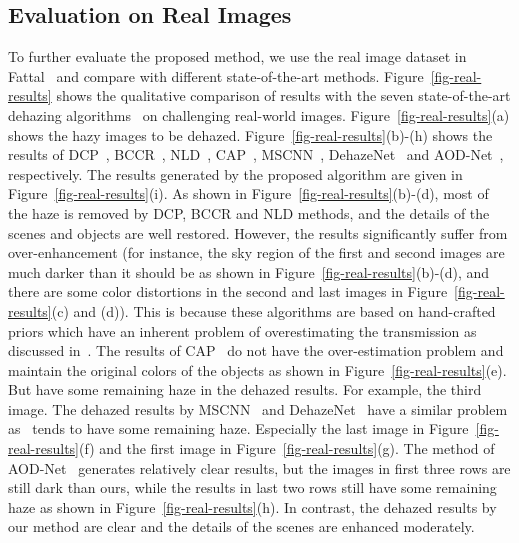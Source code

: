 \documentclass[10pt,twocolumn,letterpaper]{article}
\begin{document}
\subsection{Evaluation on Real Images}
To further evaluate the proposed method, we use the real image dataset in Fattal~\cite{fattal2014dehazing} and compare
with different state-of-the-art methods.
Figure~\ref{fig-real-results} shows the qualitative comparison of results
with the seven state-of-the-art dehazing algorithms~\cite{he2011singlecvpr,meng2013efficient,berman2016non,ren2016single,cai2016dehazenet,li2017aod} on challenging real-world images.
Figure~\ref{fig-real-results}(a) shows the hazy images to be dehazed.
Figure~\ref{fig-real-results}(b)-(h) shows the results of DCP~\cite{he2011singlecvpr}, BCCR~\cite{meng2013efficient}, NLD~\cite{berman2016non}, CAP~\cite{zhu2015fast}, MSCNN~\cite{ren2016single}, DehazeNet~\cite{cai2016dehazenet} and AOD-Net~\cite{li2017aod}, respectively.
The results generated by the proposed algorithm are given in Figure~\ref{fig-real-results}(i).
As shown in Figure~\ref{fig-real-results}(b)-(d), most of the haze is removed by DCP, BCCR and NLD methods, and the details of the scenes and objects are well restored. However, the results significantly suffer from over-enhancement (for instance, the sky region of the first and second images are much darker than it should be as shown in Figure~\ref{fig-real-results}(b)-(d), and there are some color distortions in the second and last images in Figure~\ref{fig-real-results}(c) and (d)). This is because
these algorithms are based on hand-crafted priors which
have an inherent problem of overestimating the transmission
as discussed in~\cite{he2011singlecvpr,zhu2015fast}.
The results of CAP~\cite{zhu2015fast} do not have the
over-estimation problem and maintain the original colors of
the objects as shown in Figure~\ref{fig-real-results}(e). But have
some remaining haze in the dehazed results. For example, the third image.
The dehazed results by MSCNN~\cite{ren2016single} and DehazeNet~\cite{cai2016dehazenet}
have a similar problem as~\cite{zhu2015fast} tends to have some remaining haze.
Especially the last image in Figure~\ref{fig-real-results}(f) and the first image in Figure~\ref{fig-real-results}(g).
The method of AOD-Net~\cite{li2017aod} generates relatively clear results, but the images in first three rows are still dark than ours, while the results in last two rows still have some remaining haze as shown in Figure~\ref{fig-real-results}(h).
In contrast, the dehazed results by our method are clear and the details of
the scenes are enhanced moderately.
\end{document}
